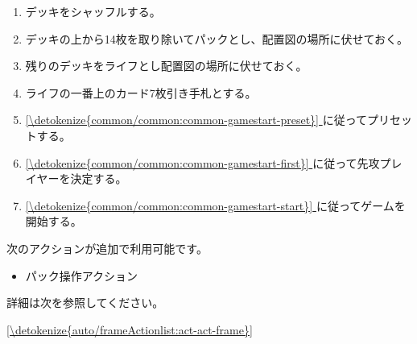 \documentclass[letterpaper,10pt,dvipdfmx]{sphinxmanual}
\begin{document}
\sphinxAtStartPar
{}
\begin{enumerate}
%
\item {} 
\sphinxAtStartPar
デッキをシャッフルする。

\item {} 
\sphinxAtStartPar
デッキの上から14枚を取り除いてパックとし、配置図の場所に伏せておく。

\item {} 
\sphinxAtStartPar
残りのデッキをライフとし配置図の場所に伏せておく。

\item {} 
\sphinxAtStartPar
ライフの一番上のカード7枚引き手札とする。

\item {} 
\sphinxAtStartPar
\hyperref[\detokenize{common/common:common-gamestart-preset}]{\ref{\detokenize{common/common:common-gamestart-preset}} } に従ってプリセットする。

\item {} 
\sphinxAtStartPar
\hyperref[\detokenize{common/common:common-gamestart-first}]{\ref{\detokenize{common/common:common-gamestart-first}} } に従って先攻プレイヤーを決定する。

\item {} 
\sphinxAtStartPar
\hyperref[\detokenize{common/common:common-gamestart-start}]{\ref{\detokenize{common/common:common-gamestart-start}} } に従ってゲームを開始する。

\end{enumerate}

\sphinxAtStartPar
{}

\sphinxAtStartPar
次のアクションが追加で利用可能です。
\begin{itemize}
\item {} 
\sphinxAtStartPar
パック操作アクション

\end{itemize}

\sphinxAtStartPar
詳細は次を参照してください。

\sphinxAtStartPar
\hyperref[\detokenize{auto/frameActionlist:act-act-frame}]{\ref{\detokenize{auto/frameActionlist:act-act-frame}} }

\sphinxAtStartPar
{}
\end{document}
